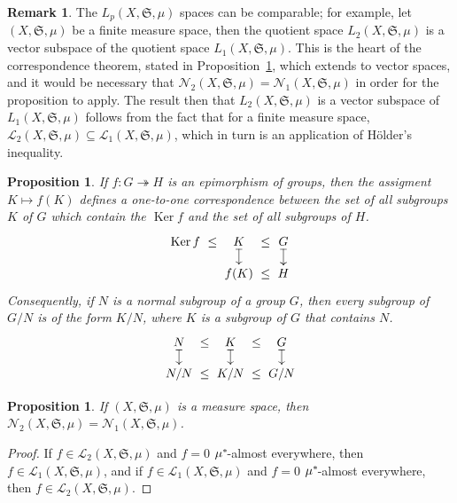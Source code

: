 \documentclass[
twoside=true,
paper=letter,
fontsize=9pt,
pagesize=auto,
leqno,
openany,
headsepline,
overfullrule,
]{scrbook}
\theoremstyle{plain}
\theoremstyle{plain}
\newtheorem{prop}[thm]{Proposition}
\theoremstyle{definition}
\newtheorem{rmk}[thm]{Remark}
\theoremstyle{bfnoteitalic}
\theoremstyle{bfnoteroman}
\newcommand{\sigalg}[1]{\mathfrak{#1}}
\newcommand{\cali}[1]{\mathscr{#1}}
\DeclareMathOperator{\kernel}{Ker}
\newcommand{\semiring}{\sigalg{S}}
\newcommand{\kernast}{\ast\kern-1pt}
\newcommand{\measurespace}{X}
\newcommand{\measure}{\mu}
\begin{document}
\begin{rmk}
The $L_p(\measurespace, \semiring, \measure)$ spaces can be comparable; for example, let $(\measurespace, \semiring, \measure)$ be a finite measure space, then the quotient space $L_2(\measurespace, \semiring, \measure)$ is a vector subspace of the quotient space
$L_1(\measurespace, \semiring, \measure)$. This is the heart of the correspondence theorem, stated in Proposition~\ref{correspondence_theorem},  which extends to vector spaces, and it would be necessary that 
$\cali{N}_2(\measurespace, \semiring, \measure) = \cali{N}_1(\measurespace, \semiring, \measure)$
in order for the proposition to apply.
The result then that 
$L_2(\measurespace, \semiring, \measure)$ is a vector subspace of
$L_1(\measurespace, \semiring, \measure)$ follows from the fact that for a finite measure space, 
$\cali{L}_2(\measurespace, \semiring, \measure)
\subseteq
\cali{L}_1(\measurespace, \semiring, \measure)$, which in turn is an application of H\"older's inequality.
\end{rmk}


\begin{prop}\label{correspondence_theorem}
If $f:G\twoheadrightarrow H$ is an epimorphism of groups, then the assigment $K\mapsto f(K)$ defines a one-to-one correspondence between the set of all subgroups $K$ of $G$ which contain the $\kernel f$ and the set of all subgroups of $H$. 
\[
\xymatrix@R=10pt@C=0pt{ 
\kernel f  & \leq  & K \ar@{|->}[d] & \leq & G \ar@{|->}[d]\\
 &  & f(K) & \leq & H\\
}
\]
Consequently, if $N$ is a normal subgroup of a group $G$, then every subgroup of $G/N$ is of the form $K/N$, where $K$ is a subgroup of $G$ that contains $N$. 
\[
\xymatrix@R=10pt@C=0pt{ 
N \ar@{|->}[d] & \leq  & K \ar@{|->}[d] & \leq & G \ar@{|->}[d]\\
N/N & \leq & K/N & \leq & G/N\\
}
\]
\end{prop}



\begin{prop}
If $(\measurespace, \semiring, \measure)$ is a measure space, then
$\cali{N}_2(\measurespace, \semiring, \measure) = \cali{N}_1(\measurespace, \semiring, \measure)$.
\end{prop}

\begin{proof}
If 
$f\in \cali{L}_2(\measurespace, \semiring, \measure)$ and $f=0$ $\measure^\kernast$-almost everywhere, then $f\in \cali{L}_1(\measurespace, \semiring, \measure)$, and if 
$f\in \cali{L}_1(\measurespace, \semiring, \measure)$ and $f=0$ $\measure^\kernast$-almost everywhere, then $f\in \cali{L}_2(\measurespace, \semiring, \measure)$.
\end{proof}
\end{document}
